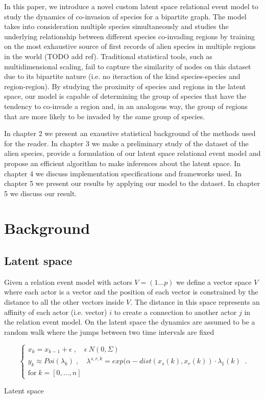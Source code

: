 \documentclass[mscthesis]{usiinfthesis}
\begin{document}
In this paper, we introduce a novel custom latent space relational event model to study the dynamics of co-invasion of species for a bipartite graph. The model takes into consideration multiple species simultaneously and studies the underlying relationship between different species co-invading regions by training on the most exhaustive source of first records of alien species in multiple regions in the world (TODO add ref). Traditional statistical tools, such as multidimensional scaling, fail to capture the similarity of nodes on this dataset due to its bipartite nature (i.e. no iteraction of the kind species-species and region-region). By studying the proximity of species and regions in the latent space, our model is capable of determining the group of species that have the tendency to co-invade a region and, in an analogous way, the group of regions that are more likely to be invaded by the same group of species. 

In chapter 2 we present an exaustive statistical background of the methods used for the reader. In chapter 3 we make a preliminary study of the  dataset of the alien species, provide a formulation of our latent space relational event model and propose an efficient algorithm to make inferences about the latent space. In chapter 4 we discuss implementation specifications and frameworks used. In chapter 5 we present our results by applying our model to the dataset. In chapter 5 we discuss our result.

\chapter{Background}

\section{Latent space}
Given a relation event model with actors $V=(1...p)$ we define a vector space $V$ where each actor is a vector and the position of each vector is constrained by the distance to all the other vectors inside $V$. The distance in this space represents an affinity of each actor (i.e. vector) $i$ to create a connection to another actor $j$ in the relation event model. On the latent space the dynamics are assumed to be a random walk where the jumps between two time intervals are fixed


\begin{eqfloat}
\begin{equation}
    \begin{cases}
      x_k = x_{k-1} + \epsilon \; , \quad \epsilon ~ N(0, \Sigma) \\
      y_k \approx Poi(\lambda_k) \; , \quad \lambda^{s, r, k} = exp(\alpha-dist(x_s(k), x_r(k)) \cdot \lambda_1(k) \\
      \textrm{for} \; k = [0, ..., n]
    \end{cases}\,.
\label{eq:latent_randomwalk}
\end{equation}
\caption{Latent space}
\end{eqfloat}
\end{document}
